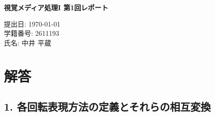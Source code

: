 ﻿\documentclass[11pt,a4paper]{ltjsarticle}
\begin{document}
\begin{center}
{\LARGE \textbf{視覚メディア処理I 第1回レポート}}
\end{center}
\vspace{1em}

\begin{flushright}
提出日: \today \\
学籍番号: 2611193 \\
氏名: 中井 平蔵
\end{flushright}

\section*{解答}
\subsection*{1. 各回転表現方法の定義とそれらの相互変換}
\setlength{\parindent}{1em}
\setlength{\leftskip}{1em}
\end{document}
